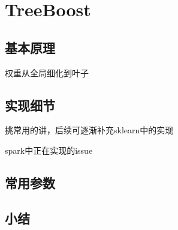 \chapter{TreeBoost}

\section{基本原理}
权重从全局细化到叶子

\section{实现细节}
挑常用的讲，后续可逐渐补充sklearn中的实现

spark中正在实现的issue

\section{常用参数}

\section{小结}
